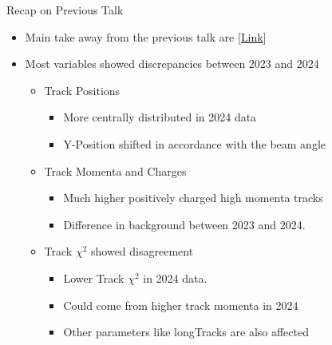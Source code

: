 \begin{frame}{Recap on Previous Talk}
    \begin{itemize}
        \small
        \item Main take away from the previous talk are [\href{https://indico.cern.ch/event/1488927/}{Link}]
        \item Most variables showed discrepancies between 2023 and 2024
        \begin{itemize}
            \item Track Positions
            \begin{itemize}
                \item More centrally distributed in 2024 data
                \item Y-Position shifted in accordance with the beam angle
            \end{itemize}
            \item Track Momenta and Charges
            \begin{itemize}
                \item Much higher positively charged high momenta tracks
                \item Difference in background between 2023 and 2024.
            \end{itemize}
            \item Track $\chi^2$ showed disagreement
            \begin{itemize}
                \item Lower Track $\chi^2$ in 2024 data.
                \item Could come from higher track momenta in 2024
                \item Other parameters like longTracks are also affected
            \end{itemize}
        \end{itemize}
    \end{itemize}    
\end{frame}



